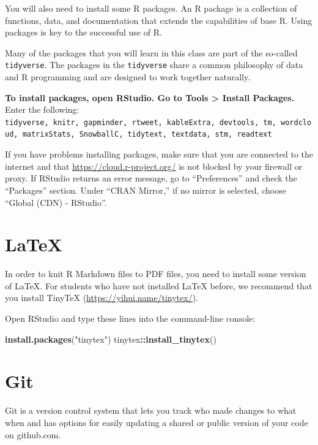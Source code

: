 \documentclass[
]{book}
\newenvironment{Shaded}{\begin{snugshade}}{\end{snugshade}}
\newcommand{\KeywordTok}[1]{\textcolor[rgb]{0.13,0.29,0.53}{\textbf{#1}}}
\newcommand{\NormalTok}[1]{#1}
\newcommand{\OperatorTok}[1]{\textcolor[rgb]{0.81,0.36,0.00}{\textbf{#1}}}
\newcommand{\StringTok}[1]{\textcolor[rgb]{0.31,0.60,0.02}{#1}}
\begin{document}
You will also need to install some R packages. An R package is a collection of functions, data, and documentation that extends the capabilities of base R. Using packages is key to the successful use of R.

Many of the packages that you will learn in this class are part of the so-called \texttt{tidyverse}. The packages in the \texttt{tidyverse} share a common philosophy of data and R programming and are designed to work together naturally.

\textbf{To install packages, open RStudio. Go to Tools \textgreater{} Install Packages.} Enter the following: \texttt{tidyverse,\ knitr,\ gapminder,\ rtweet,\ kableExtra,\ devtools,\ tm,\ wordcloud,\ matrixStats,\ SnowballC,\ tidytext,\ textdata,\ stm,\ readtext}

If you have problems installing packages, make sure that you are connected to the internet and that \url{https://cloud.r-project.org/} is not blocked by your firewall or proxy. If RStudio returns an error message, go to ``Preferences'' and check the ``Packages'' section. Under ``CRAN Mirror,'' if no mirror is selected, choose ``Global (CDN) - RStudio''.

\hypertarget{latex}{%
\section{LaTeX}\label{latex}}

In order to knit R Markdown files to PDF files, you need to install some version of LaTeX. For students who have not installed LaTeX before, we recommend that you install TinyTeX (\url{https://yihui.name/tinytex/}).

Open RStudio and type these lines into the command-line console:

\begin{Shaded}
\begin{Highlighting}[]
\KeywordTok{install.packages}\NormalTok{(}\StringTok{"tinytex"}\NormalTok{)}
\NormalTok{tinytex}\OperatorTok{::}\KeywordTok{install_tinytex}\NormalTok{() }
\end{Highlighting}
\end{Shaded}

\hypertarget{git}{%
\section{Git}\label{git}}

Git is a version control system that lets you track who made changes to what when and has options for easily updating a shared or public version of your code on github.com.
\end{document}
